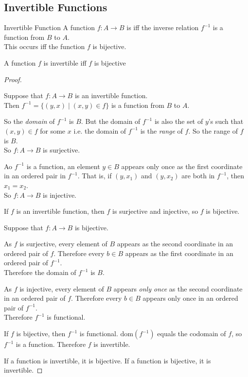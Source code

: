 \documentclass[../notes.tex]{subfiles}
\begin{document}
			\subsection{Invertible Functions}
				\begin{definition}{Invertible Function}
					A function $f: A \rightarrow B$ is  iff the inverse relation $f^{-1}$ is a function from $B$ to $A$.\\
					This occurs iff the function $f$ is bijective.
				\end{definition}
				\begin{theorem}{A function $f$ is invertible iff $f$ is bijective}
					\begin{proof}
						$ $
						\begin{indentparagraph}
							\begin{subproof}[Subproof]
								Suppose that $f: A \rightarrow B$ is an invertible function.\\
								Then $f^{-1} = \bigl\{(y, x) \mid (x, y) \in f\bigr\}$ is a function from $B$ to $A$.

								So the \emph{domain} of $f^{-1}$ is $B$. But the domain of $f^{-1}$ is also the set of $y$'s such that $(x, y) \in f$ for some $x$ i.e. the domain of $f^{-1}$ is the \emph{range} of $f$. So the range of $f$ is $B$.\\
								So $f: A \rightarrow B$ is surjective.

								Ao $f^{-1}$ is a function, an element $y \in B$ appears only once as the first coordinate in an ordered pair in $f^{-1}$. That is, if $(y, x_{1})$ and $(y, x_{2})$ are both in $f^{-1}$, then $x_{1} = x_{2}$.\\
								So $f: A \rightarrow B$ is injective.

								If $f$ is an invertible function, then $f$ is surjective and injective, so $f$ is bijective.
							\end{subproof}
							\begin{subproof}[Subproof]
								Suppose that $f: A \rightarrow B$ is bijective.

								As $f$ is surjective, every element of $B$ appears as the second coordinate in an ordered pair of $f$. Therefore every $b \in B$ appears as the first coordinate in an ordered pair of $f^{-1}$.\\
								Therefore the domain of $f^{-1}$ is $B$.

								As $f$ is injective, every element of $B$ appears \emph{only once} as the second coordinate in an ordered pair of $f$. Therefore every $b \in B$ appears only once in an ordered pair of $f^{-1}$.\\
								Therefore $f^{-1}$ is functional.

								If $f$ is bijective, then $f^{-1}$ is functional. $\mathrm{dom}(f^{-1})$ equals the codomain of $f$, so $f^{-1}$ is a function. Therefore $f$ is invertible.
							\end{subproof}
						\end{indentparagraph}
						If a function is invertible, it is bijective. If a function is bijective, it is invertible.
					\end{proof}
				\end{theorem}
\end{document}
